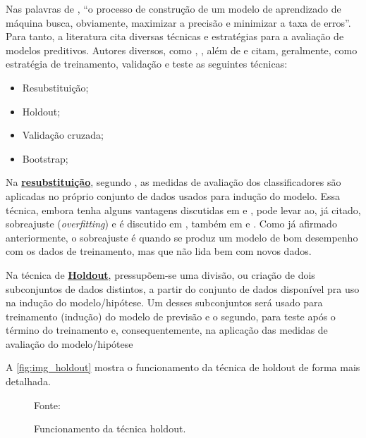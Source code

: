 Nas palavras de , ``o processo de construção de um modelo de aprendizado de máquina busca, obviamente, maximizar a precisão e minimizar a taxa de erros''. Para tanto, a literatura cita diversas técnicas e estratégias para a avaliação de modelos preditivos. Autores diversos, como , , além de   e  citam, geralmente, como estratégia de treinamento, validação e teste as seguintes técnicas:
\begin{itemize}
	\item Resubstituição;
	\item Holdout;
	\item Validação cruzada;
	\item Bootstrap;
\end{itemize}
Na \textbf{\underline{resubstituição}}, segundo , as medidas de avaliação dos classificadores são aplicadas no próprio conjunto de dados usados para indução do modelo. Essa técnica, embora tenha alguns vantagens discutidas em  e , pode levar ao, já citado, sobreajuste (\textit{overfitting}) e é discutido em , também em  e . Como já afirmado anteriormente, o sobreajuste é quando se produz um modelo de bom desempenho com os dados de treinamento, mas que não lida bem com novos dados.

Na técnica de \textbf{\underline{Holdout}}, pressupõem-se uma divisão, ou criação de dois subconjuntos de dados distintos, a partir do conjunto de dados disponível pra uso na indução do modelo/hipótese. Um desses subconjuntos será usado para treinamento (indução) do modelo de previsão e o segundo, para teste após o término do treinamento e, consequentemente, na aplicação das medidas de avaliação do modelo/hipótese \cite{Boscarioli2017}

A \autoref{fig:img_holdout} mostra o funcionamento da técnica de holdout de forma mais detalhada.
\begin{figure}[h!]
	\centering
	\caption{Funcionamento da técnica holdout.}
	
	{\scriptsize Fonte:\cite{aprenda_mineracao_fernando_amaral16}}
	\label{fig:img_holdout}
\end{figure}

